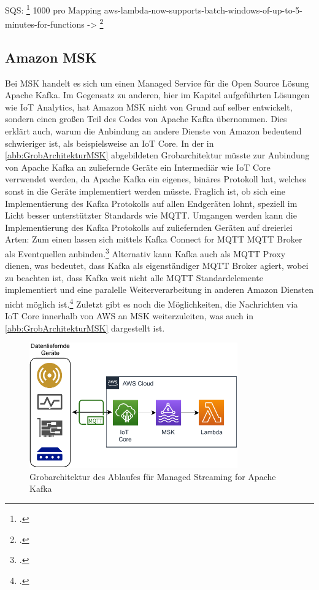 SQS: \footcite[][]{AmazonWebServicesInc..o.J.n} 1000 pro Mapping
aws-lambda-now-supports-batch-windows-of-up-to-5-minutes-for-functions -> \footcite[][]{AmazonWebServicesInc..2020b}

\subsection{Amazon MSK}
Bei \ac{MSK} handelt es sich um einen Managed Service für die Open Source Lösung Apache Kafka. Im Gegensatz zu anderen, hier im Kapitel aufgeführten Lösungen wie \ac{IoT} Analytics, hat Amazon \ac{MSK} nicht von Grund auf selber entwickelt, sondern einen großen Teil des Codes von Apache Kafka übernommen. Dies erklärt auch, warum die Anbindung an andere Dienste von Amazon bedeutend schwieriger ist, als beispielsweise an \ac{IoT} Core. In der in \autoref{abb:GrobArchitekturMSK} abgebildeten Grobarchitektur müsste zur Anbindung von Apache Kafka an zuliefernde Geräte ein Intermediär wie \ac{IoT} Core verrwendet werden, da Apache Kafka ein eigenes, binäres Protokoll hat, welches sonst in die Geräte implementiert werden müsste.  Fraglich ist, ob sich eine Implementierung des Kafka Protokolls auf allen Endgeräten lohnt, speziell im Licht besser unterstützter Standards wie \ac{MQTT}. Umgangen werden kann die Implementierung des Kafka Protokolls auf zuliefernden Geräten auf dreierlei Arten: Zum einen lassen sich mittels Kafka Connect for \ac{MQTT} \ac{MQTT} Broker als Eventquellen anbinden.\footcite[Vgl.][]{Erber.12.01.2021} Alternativ kann Kafka auch als \ac{MQTT} Proxy dienen, was bedeutet, dass Kafka als eigenständiger MQTT Broker agiert, wobei zu beachten ist, dass Kafka weit nicht alle \ac{MQTT} Standardelemente implementiert und eine paralelle Weiterverarbeitung in anderen Amazon Diensten nicht möglich ist.\footcite[Vgl.][]{Erber.12.01.2021} Zuletzt gibt es noch die Möglichkeiten, die Nachrichten via \ac{IoT} Core innerhalb von \ac{AWS} an \ac{MSK} weiterzuleiten, was auch in \autoref{abb:GrobArchitekturMSK} dargestellt ist.
\begin{figure}[H]
\centering
\includegraphics[width=0.8\textwidth]{graphics/MSK-general.pdf}
\caption{Grobarchitektur des Ablaufes für Managed Streaming for Apache Kafka}
\label{abb:GrobArchitekturMSK}
\end{figure}

